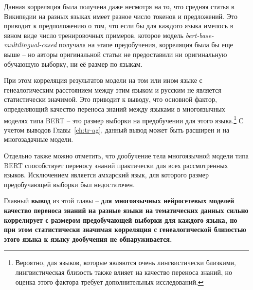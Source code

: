 Данная корреляция была получена даже несмотря на то, что средняя статья в Википедии на разных языках имеет разное число токенов и предложений. Это приводит к предположению о том, что если бы для каждого языка имелось в явном виде число тренировочных примеров, которое модель \textit{bert-base-multilingual-cased} получала на этапе предобучения, корреляция была бы еще выше -- но авторы оригинальной статьи не предоставили ни оригинальную обучающую выборку, ни её размер по языкам. 

При этом корреляция результатов модели на том или ином языке с генеалогическим расстоянием между этим языком и русским не является статистически значимой. Это приводит к выводу, что основной фактор, определяющий качество переноса знаний между языками в многоязычных моделях типа BERT -- это размер выборки на предобучении для этого языка.\footnote{Вероятно, для языков, которые являются очень лингвистически близкими, лингвистическая близость также влияет на качество переноса знаний, но оценка этого фактора требует дополнительных исследований.} С учетом выводов Главы~\ref{ch:tr-ag}, данный вывод может быть расширен и на многозадачные модели.

Отдельно также можно отметить, что дообучение тела многоязычной модели типа BERT способствует переносу знаний практически для всех рассмотренных языков. Исключением является амхарский язык, для которого размер предобучающей выборки был недостаточен.

Главный \textbf{вывод} из этой главы -- \textbf{для многоязычных нейросетевых моделей качество переноса знаний на разные языки на тематических данных сильно коррелирует с размером предобучающей выборки для каждого языка, но при этом статистически значимая корреляция с генеалогической близостью этого языка к языку дообучения не обнаруживается.}


 
